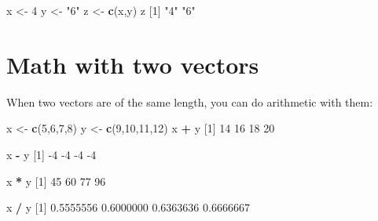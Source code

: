 \documentclass[
]{book}
\newenvironment{Shaded}{\begin{snugshade}}{\end{snugshade}}
\newcommand{\DecValTok}[1]{\textcolor[rgb]{0.00,0.00,0.81}{#1}}
\newcommand{\FloatTok}[1]{\textcolor[rgb]{0.00,0.00,0.81}{#1}}
\newcommand{\KeywordTok}[1]{\textcolor[rgb]{0.13,0.29,0.53}{\textbf{#1}}}
\newcommand{\NormalTok}[1]{#1}
\newcommand{\OperatorTok}[1]{\textcolor[rgb]{0.81,0.36,0.00}{\textbf{#1}}}
\newcommand{\StringTok}[1]{\textcolor[rgb]{0.31,0.60,0.02}{#1}}
\begin{document}
\begin{Shaded}
\begin{Highlighting}[]
\NormalTok{x <-}\StringTok{ }\DecValTok{4}
\NormalTok{y <-}\StringTok{ "6"}
\NormalTok{z <-}\StringTok{ }\KeywordTok{c}\NormalTok{(x,y)}
\NormalTok{z}
\NormalTok{[}\DecValTok{1}\NormalTok{] }\StringTok{"4"} \StringTok{"6"}
\end{Highlighting}
\end{Shaded}

\hypertarget{math-with-two-vectors}{%
\section*{Math with two vectors}\label{math-with-two-vectors}}

When two vectors are of the same length, you can do arithmetic with them:

\begin{Shaded}
\begin{Highlighting}[]
\NormalTok{x <-}\StringTok{ }\KeywordTok{c}\NormalTok{(}\DecValTok{5}\NormalTok{,}\DecValTok{6}\NormalTok{,}\DecValTok{7}\NormalTok{,}\DecValTok{8}\NormalTok{)}
\NormalTok{y <-}\StringTok{ }\KeywordTok{c}\NormalTok{(}\DecValTok{9}\NormalTok{,}\DecValTok{10}\NormalTok{,}\DecValTok{11}\NormalTok{,}\DecValTok{12}\NormalTok{)}
\NormalTok{x }\OperatorTok{+}\StringTok{ }\NormalTok{y}
\NormalTok{[}\DecValTok{1}\NormalTok{] }\DecValTok{14} \DecValTok{16} \DecValTok{18} \DecValTok{20}
\end{Highlighting}
\end{Shaded}

\begin{Shaded}
\begin{Highlighting}[]
\NormalTok{x }\OperatorTok{-}\StringTok{ }\NormalTok{y}
\NormalTok{[}\DecValTok{1}\NormalTok{] }\DecValTok{-4} \DecValTok{-4} \DecValTok{-4} \DecValTok{-4}
\end{Highlighting}
\end{Shaded}

\begin{Shaded}
\begin{Highlighting}[]
\NormalTok{x }\OperatorTok{*}\StringTok{ }\NormalTok{y}
\NormalTok{[}\DecValTok{1}\NormalTok{] }\DecValTok{45} \DecValTok{60} \DecValTok{77} \DecValTok{96}
\end{Highlighting}
\end{Shaded}

\begin{Shaded}
\begin{Highlighting}[]
\NormalTok{x }\OperatorTok{/}\StringTok{ }\NormalTok{y}
\NormalTok{[}\DecValTok{1}\NormalTok{] }\FloatTok{0.5555556} \FloatTok{0.6000000} \FloatTok{0.6363636} \FloatTok{0.6666667}
\end{Highlighting}
\end{Shaded}
\end{document}
